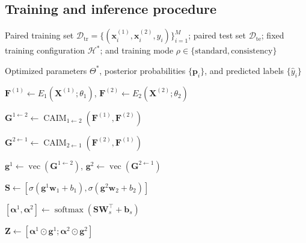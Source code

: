 \documentclass[a4paper]{cas-sc}
\begin{document}
\subsection{Training and inference procedure}
\label{sec:training_inference}

\begin{algorithm}[!htbp]
\small
\caption{Training and inference procedure of MHFL-MCA}
\label{alg:mhfl_mca}
\begin{algorithmic}[1]

\Require Paired training set
$\mathcal{D}_{\mathrm{tr}}
=\{(\mathbf{x}_{i}^{(1)},\mathbf{x}_{i}^{(2)},y_i)\}_{i=1}^{M}$;
paired test set $\mathcal{D}_{\mathrm{te}}$;
fixed training configuration $\mathcal{H}^{\ast}$;
and training mode
$\rho\in\{\mathrm{standard},\mathrm{consistency}\}$

\Ensure Optimized parameters $\Theta^{\ast}$,
posterior probabilities $\{\mathbf{p}_i\}$,
and predicted labels $\{\hat{y}_i\}$


    \State $\mathbf{F}^{(1)}
    \gets E_{1}(\mathbf{X}^{(1)};\theta_{1})$,
    $\mathbf{F}^{(2)}
    \gets E_{2}(\mathbf{X}^{(2)};\theta_{2})$

    \State $\mathbf{G}^{1\leftarrow2}
    \gets
    \operatorname{CAIM}_{1\leftarrow2}
    (\mathbf{F}^{(1)},\mathbf{F}^{(2)})$

    \State $\mathbf{G}^{2\leftarrow1}
    \gets
    \operatorname{CAIM}_{2\leftarrow1}
    (\mathbf{F}^{(2)},\mathbf{F}^{(1)})$

    \State $\mathbf{g}^{1}
    \gets
    \operatorname{vec}(\mathbf{G}^{1\leftarrow2})$,
    $\mathbf{g}^{2}
    \gets
    \operatorname{vec}(\mathbf{G}^{2\leftarrow1})$

    \State $\mathbf{S}
    \gets
    \left[
    \sigma(\mathbf{g}^{1}\mathbf{w}_{1}+b_{1}),
    \sigma(\mathbf{g}^{2}\mathbf{w}_{2}+b_{2})
    \right]$

    \State
    $\left[
    \boldsymbol{\alpha}^{1},
    \boldsymbol{\alpha}^{2}
    \right]
    \gets
    \operatorname{softmax}
    \left(
    \mathbf{S}\mathbf{W}_{s}^{\top}
    +\mathbf{b}_{s}
    \right)$

    \State $\mathbf{Z}
    \gets
    \left[
    \boldsymbol{\alpha}^{1}\odot\mathbf{g}^{1};
    \boldsymbol{\alpha}^{2}\odot\mathbf{g}^{2}
    \right]$


\end{algorithmic}
\end{algorithm}
\end{document}
